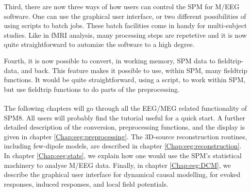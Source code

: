 Third, there are now three ways of how users can control the
SPM for M/EEG software. One can use the graphical user interface, or two
different possibilities of using scripts to batch jobs. These batch
facilities come in handy for multi-subject studies. Like in fMRI
analysis, many processing steps are repetetive and it is now quite
straightforward to automize the software to a high degree.

Fourth, it is now possible to convert, in working memory, SPM
data to fieldtrip-data, and back. This feature makes it possible to 
use, within SPM, many fieldtrip functions. It would be quite
straightforward, using a script, to work within SPM, but use fieldtrip
functions to do parts of the preprocessing. 
\\
\\
The following chapters will go through all the EEG/MEG related
functionality of SPM8. All users will probably find the tutorial
useful for a quick start. A further detailed description of the
conversion, preprocessing functions, and the display is given in chapter
\ref{Chap:eeg:preprocessing}. The 3D-source reconstruction routines,
including few-dipole models, are described in chapter
\ref{Chap:eeg:reconstruction}. In chapter \ref{Chap:eeg:stats}, we
explain how one would use the SPM's statistical machinery to analyse
M/EEG data. Finally, in chapter \ref{Chap:eeg:DCM}, we describe the
graphical user interface for dynamical causal modelling, for evoked  
responses, induced responses, and local field potentials.


